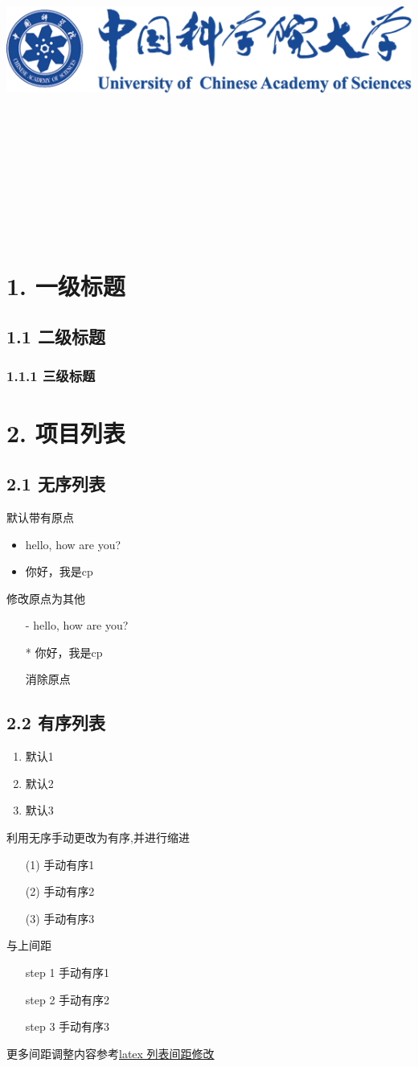 \documentclass{article}
\title{
	\includegraphics[scale = 0.45]{images/ucas-logo.png}\\
    \vspace{1in}
    \textmd{\textbf{\hmwkClass\ \hmwkTitle}}\\
    \textmd{\textbf{\hmwkSubTitle}}\\
    \normalsize\vspace{0.1in}\small{\hmwkCompleteTime }\\
    \vspace{0.1in}\large{\textit{\hmwkClassInstructor\ }}\\
    \vspace{3in}
}
\author{\hmwkAuthorName}
\date{}
\begin{document}
\maketitle

\pagebreak

\section{1. 一级标题}
\subsection{1.1 二级标题}
\subsubsection{1.1.1 三级标题}
\section{2. 项目列表} 
\subsection{2.1 无序列表}

默认带有原点
\begin{itemize}
	\item hello, how are you?
	\item 你好，我是cp
\end{itemize} 
修改原点为其他 
\begin{itemize}
	\item[-] hello, how are you?
	\item[*] 你好，我是cp
	\item[] 消除原点
\end{itemize} 


\subsection{2.2 有序列表} 

\begin{enumerate}
	\item 默认1
	\item 默认2
	\item 默认3
\end{enumerate}

利用无序手动更改为有序,并进行缩进
\begin{itemize}[itemindent=1em]
	\item[(1)] 手动有序1
	\item[(2)] 手动有序2
	\item[(3)] 手动有序3
\end{itemize} 
与上间距
\begin{itemize}[itemindent= 15 pt]
	\item[step 1] 手动有序1
	\item[step 2] 手动有序2
	\item[step 3] 手动有序3
\end{itemize} 
更多间距调整内容参考\href{https://blog.csdn.net/robert_chen1988/article/details/83179571}{latex 列表间距修改} 
\end{document}
